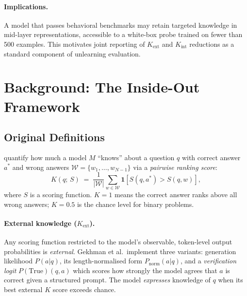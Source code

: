 \documentclass[11pt]{article}
\begin{document}
\paragraph{Implications.}
A model that passes behavioral benchmarks may retain targeted knowledge in
mid-layer representations, accessible to a white-box probe trained on fewer
than 500 examples.
This motivates joint reporting of $K_\text{ext}$ and $K_\text{int}$ reductions
as a standard component of unlearning evaluation.

\section{Background: The Inside-Out Framework}
\label{sec:background}

\subsection{Original Definitions}
\label{sec:original-defs}

\citet{gekhman2025insideout} quantify how much a model $M$ ``knows'' about a
question $q$ with correct answer $a^*$ and wrong answers
$\mathcal{W} = \{w_1,\ldots,w_{N-1}\}$ via a \emph{pairwise ranking score}:
\begin{equation}
K(q;\,S) \;=\; \frac{1}{|\mathcal{W}|}\sum_{w\in\mathcal{W}}
\mathbf{1}\!\left[S(q,a^*) > S(q,w)\right],
\label{eq:kscore}
\end{equation}
where $S$ is a scoring function.
$K = 1$ means the correct answer ranks above all wrong answers;
$K = 0.5$ is the chance level for binary problems.

\paragraph{External knowledge ($K_\text{ext}$).}
Any scoring function restricted to the model's observable, token-level output
probabilities is \emph{external}.
Gekhman et al.\ implement three variants: generation likelihood $P(a|q)$,
its length-normalised form $P_\text{norm}(a|q)$, and a \emph{verification logit}
$P(\text{True})(q,a)$ which scores how strongly the model agrees that $a$ is
correct given a structured prompt.
The model \emph{expresses} knowledge of $q$ when its best external $K$ score
exceeds chance.
\end{document}
